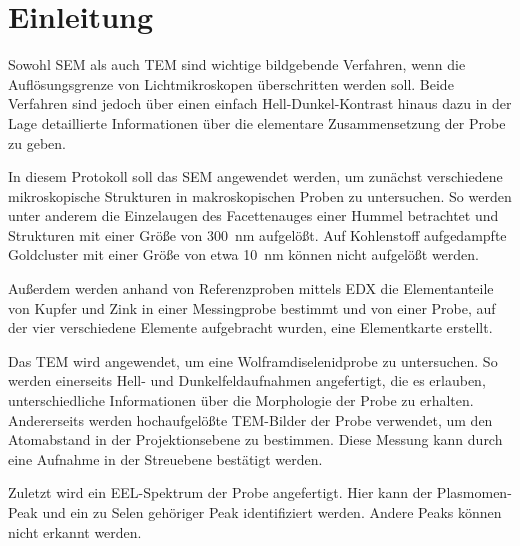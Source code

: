 \section{Einleitung}

	Sowohl SEM als auch TEM sind wichtige bildgebende Verfahren, wenn die Auflösungsgrenze von Lichtmikroskopen überschritten werden soll.
	Beide Verfahren sind jedoch über einen einfach Hell-Dunkel-Kontrast hinaus dazu in der Lage detaillierte Informationen über die elementare Zusammensetzung der Probe zu geben.

	In diesem Protokoll soll das SEM angewendet werden, um zunächst verschiedene mikroskopische Strukturen in makroskopischen Proben zu untersuchen.
	So werden unter anderem die Einzelaugen des Facettenauges einer Hummel betrachtet und Strukturen mit einer Größe von \SI{300}{nm} aufgelößt.
	Auf Kohlenstoff aufgedampfte Goldcluster mit einer Größe von etwa \SI{10}{nm} können nicht aufgelößt werden.

	Außerdem werden anhand von Referenzproben mittels EDX die Elementanteile von Kupfer und Zink in einer Messingprobe bestimmt und von einer Probe, auf der vier verschiedene Elemente aufgebracht wurden, eine Elementkarte erstellt.
	\par
	Das TEM wird angewendet, um eine Wolframdiselenidprobe zu untersuchen.
	So werden einerseits Hell- und Dunkelfeldaufnahmen angefertigt, die es erlauben, unterschiedliche Informationen über die Morphologie der Probe zu erhalten.
	Andererseits werden hochaufgelößte TEM-Bilder der Probe verwendet, um den Atomabstand in der Projektionsebene zu bestimmen.
	Diese Messung kann durch eine Aufnahme in der Streuebene bestätigt werden.

	Zuletzt wird ein EEL-Spektrum der Probe angefertigt.
	Hier kann der Plasmomen-Peak und ein zu Selen gehöriger Peak identifiziert werden.
	Andere Peaks können nicht erkannt werden.
